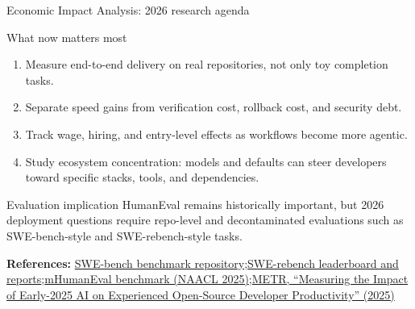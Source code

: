 \documentclass[aspectratio=43,9pt]{beamer}
\newcommand{\srclink}[2]{\href{#2}{\textcolor{black!68}{#1}}}
\newcommand{\sep}{;\hspace{0.35em}}
\newcommand{\refline}[2][References]{%
  \vfill
  {\raggedright\fontsize{5.1}{5.5}\selectfont\color{black!68}\textbf{#1:} #2\par}%
}
\newcommand{\srcMETR}{\srclink{METR, ``Measuring the Impact of Early-2025 AI on Experienced Open-Source Developer Productivity'' (2025)}{https://arxiv.org/abs/2507.09089}}
\newcommand{\srcSWEBench}{\srclink{SWE-bench benchmark repository}{https://github.com/swe-bench/SWE-bench}}
\newcommand{\srcSWERebench}{\srclink{SWE-rebench leaderboard and reports}{https://swe-rebench.com/}}
\newcommand{\srcMHumanEval}{\srclink{mHumanEval benchmark (NAACL 2025)}{https://aclanthology.org/2025.naacl-long.570/}}
\begin{document}
\begin{frame}{Economic Impact Analysis: 2026 research agenda}
\small
\begin{block}{What now matters most}
\begin{enumerate}
  \item Measure end-to-end delivery on real repositories, not only toy completion tasks.
  \item Separate speed gains from verification cost, rollback cost, and security debt.
  \item Track wage, hiring, and entry-level effects as workflows become more agentic.
  \item Study ecosystem concentration: models and defaults can steer developers toward specific stacks, tools, and dependencies.
\end{enumerate}
\end{block}

\begin{block}{Evaluation implication}
HumanEval remains historically important, but 2026 deployment questions require repo-level and decontaminated evaluations such as SWE-bench-style and SWE-rebench-style tasks.
\end{block}

\refline{\srcSWEBench\sep \srcSWERebench\sep \srcMHumanEval\sep \srcMETR}
\end{frame}
\end{document}
